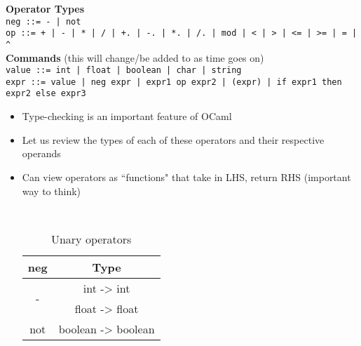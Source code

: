 \noindent
\textbf{Operator Types} \\
\texttt{neg ::= - | not} \\
\texttt{op ::= + | - | * | / | +.\ | -.\ | *.\ | /.\ | mod | < | > | <= | >= | = | \^{}} \\

\noindent
\textbf{Commands} (this will change/be added to as time goes on) \\
\texttt{value ::= int | float | boolean | char | string} \\
\texttt{expr ::= value | neg expr | expr1 op expr2 | (expr) | \lstinline{if expr1 then expr2 else expr3}} \\

\noindent
\begin{itemize}
    \item Type-checking is an important feature of \textsf{OCaml}
    \item Let us review the types of each of these operators and their respective operands
    \item Can view operators as ``functions" that take in LHS, return RHS (important way to think)
    \begin{table}[h]
    \caption{Unary operators}
    \centering
    {\tt
        \begin{tabular}{cc}
        neg & Type \\
        \hline
        \multirow{2}{*}{-} & int -> int \\
                           & float -> float \\
        not                & boolean -> boolean \\
        \hline
        \end{tabular}
    }
    \end{table}
    

\end{itemize}

